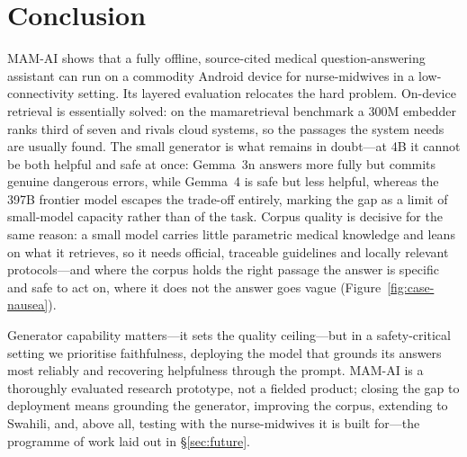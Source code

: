 \section{Conclusion}
\label{sec:conclusion}

MAM-AI shows that a fully offline, source-cited medical question-answering
assistant can run on a commodity Android device for nurse-midwives in a
low-connectivity setting. Its layered evaluation relocates the hard problem.
On-device retrieval is essentially solved: on the mamaretrieval benchmark a 300M
embedder ranks third of seven and rivals cloud systems, so the passages the
system needs are usually found. The small generator is what remains in
doubt---at 4B it cannot be both helpful and safe at once: Gemma~3n answers more
fully but commits genuine dangerous errors, while Gemma~4 is safe but less
helpful, whereas the 397B frontier model escapes the trade-off entirely, marking
the gap as a limit of small-model capacity rather than of the task. Corpus
quality is decisive for the same reason: a small model carries little parametric
medical knowledge and leans on what it retrieves, so it needs official,
traceable guidelines and locally relevant protocols---and where the corpus holds
the right passage the answer is specific and safe to act on, where it does not
the answer goes vague (Figure~\ref{fig:case-nausea}).

Generator capability matters---it sets the quality ceiling---but in a
safety-critical setting we prioritise faithfulness, deploying the model that
grounds its answers most reliably and recovering helpfulness through the prompt.
MAM-AI is a thoroughly evaluated research prototype, not a fielded product;
closing the gap to deployment means grounding the generator, improving the
corpus, extending to Swahili, and, above all, testing with the nurse-midwives it
is built for---the programme of work laid out in \S\ref{sec:future}.
